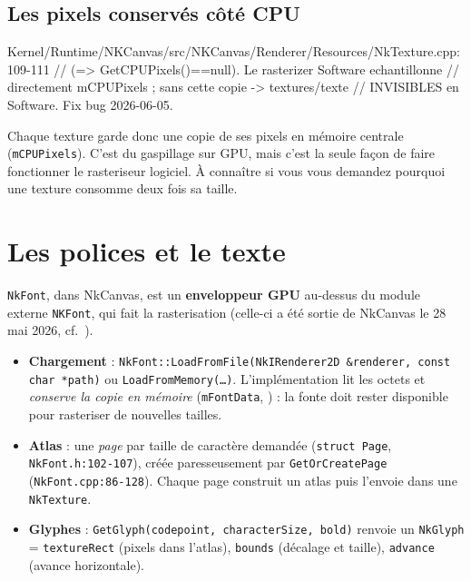 \subsection{Les pixels conservés côté CPU}

\begin{nkcode}{Kernel/Runtime/NKCanvas/src/NKCanvas/Renderer/Resources/NkTexture.cpp:109-111}
// (=> GetCPUPixels()==null). Le rasterizer Software echantillonne
// directement mCPUPixels ; sans cette copie -> textures/texte
// INVISIBLES en Software. Fix bug 2026-06-05.
\end{nkcode}

Chaque texture garde donc une copie de ses pixels en mémoire centrale
(\texttt{mCPUPixels}). C'est du gaspillage sur GPU, mais c'est la seule façon de
faire fonctionner le rasteriseur logiciel. À connaître si vous vous demandez
pourquoi une texture consomme deux fois sa taille.

\section{Les polices et le texte}

\texttt{NkFont}, dans NkCanvas, est un \textbf{enveloppeur GPU} au-dessus du
module externe \texttt{NKFont}, qui fait la rasterisation (celle-ci a été sortie
de NkCanvas le 28 mai 2026, cf.\ ).

\begin{itemize}
  \item \textbf{Chargement} :
        \texttt{NkFont::LoadFromFile(NkIRenderer2D \&renderer, const char *path)}
        ou \texttt{LoadFromMemory(\dots)}. L'implémentation lit les octets et
        \emph{conserve la copie en mémoire} (\texttt{mFontData},
        ) : la fonte doit rester disponible pour
        rasteriser de nouvelles tailles.
  \item \textbf{Atlas} : une \emph{page} par taille de caractère demandée
        (\texttt{struct Page}, \texttt{NkFont.h:102-107}), créée paresseusement
        par \texttt{GetOrCreatePage} (\texttt{NkFont.cpp:86-128}). Chaque page
        construit un atlas puis l'envoie dans une \texttt{NkTexture}.
  \item \textbf{Glyphes} :
        \texttt{GetGlyph(codepoint, characterSize, bold)} renvoie un
        \texttt{NkGlyph} = \texttt{textureRect} (pixels dans l'atlas),
        \texttt{bounds} (décalage et taille), \texttt{advance} (avance
        horizontale).
\end{itemize}


